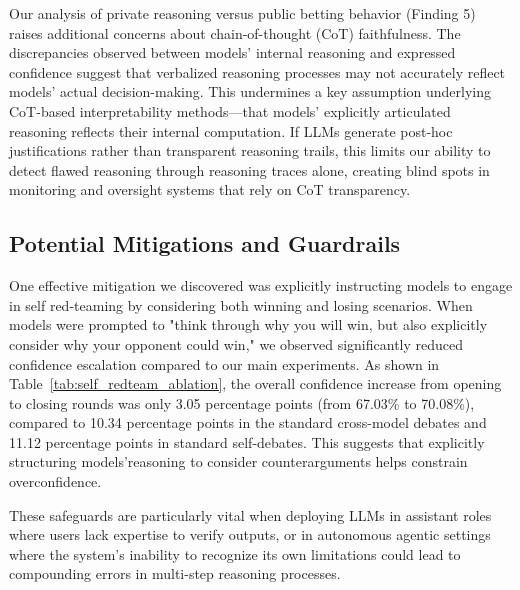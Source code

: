 \documentclass{article}
\begin{document}
Our analysis of private reasoning versus public betting behavior (Finding 5) raises additional concerns about chain-of-thought (CoT) faithfulness. The discrepancies observed between models' internal reasoning and expressed confidence suggest that verbalized reasoning processes may not accurately reflect models' actual decision-making. This undermines a key assumption underlying CoT-based interpretability methods—that models' explicitly articulated reasoning reflects their internal computation. If LLMs generate post-hoc justifications rather than transparent reasoning trails, this limits our ability to detect flawed reasoning through reasoning traces alone, creating blind spots in monitoring and oversight systems that rely on CoT transparency.

\subsection{Potential Mitigations and Guardrails}
One effective mitigation we discovered was explicitly instructing models to engage in self red-teaming by considering both winning and losing scenarios. When models were prompted to "think through why you will win, but also explicitly consider why your opponent could win," we observed significantly reduced confidence escalation compared to our main experiments. As shown in Table~\ref{tab:self_redteam_ablation}, the overall confidence increase from opening to closing rounds was only 3.05 percentage points (from 67.03\% to 70.08\%), compared to 10.34 percentage points in the standard cross-model debates and 11.12 percentage points in standard self-debates. This suggests that explicitly structuring models'reasoning to consider counterarguments helps constrain overconfidence.

These safeguards are particularly vital when deploying LLMs in assistant roles where users lack expertise to verify outputs, or in autonomous agentic settings where the system's inability to recognize its own limitations could lead to compounding errors in multi-step reasoning processes.
\end{document}

